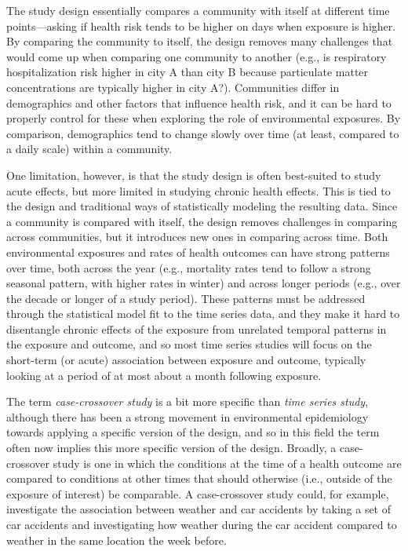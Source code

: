 \documentclass[
]{book}
\begin{document}
The study design essentially compares a community with itself at different time
points---asking if health risk tends to be higher on days when exposure is higher.
By comparing the community to itself, the design removes many challenges that would
come up when comparing one community to another (e.g., is respiratory hospitalization
risk higher in city A than city B because particulate matter concentrations are
typically higher in city A?). Communities differ in demographics and other factors
that influence health risk, and it can be hard to properly control for these when
exploring the role of environmental exposures. By comparison, demographics tend to
change slowly over time (at least, compared to a daily scale) within a community.

One limitation, however, is that the study design is often best-suited to study
acute effects, but more limited in studying chronic health effects. This is tied
to the design and traditional ways of statistically modeling the resulting
data. Since a community is compared with itself, the design removes challenges in
comparing across communities, but it introduces new ones in comparing across time.
Both environmental exposures and rates of health outcomes can have strong
patterns over time, both across the year (e.g., mortality rates tend to follow
a strong seasonal pattern, with higher rates in winter) and across longer periods
(e.g., over the decade or longer of a study period). These patterns must be
addressed through the statistical model fit to the time series data, and they
make it hard to disentangle chronic effects of the exposure from unrelated
temporal patterns in the exposure and outcome, and so most time series studies
will focus on the short-term (or acute) association between exposure and outcome,
typically looking at a period of at most about a month following exposure.

The term \emph{case-crossover study} is a bit more specific than \emph{time series study},
although there has been a strong movement in environmental epidemiology towards
applying a specific version of the design, and so in this field the term often
now implies this more specific version of the design. Broadly, a case-crossover
study is one in which the conditions at the time of a health outcome are compared
to conditions at other times that should otherwise (i.e., outside of the exposure
of interest) be comparable. A case-crossover study could, for example, investigate
the association between weather and car accidents by taking a set of car accidents
and investigating how weather during the car accident compared to weather in the
same location the week before.
\end{document}
